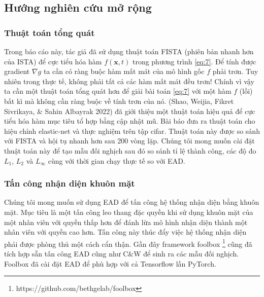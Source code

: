 \subsection{Hướng nghiên cứu mở rộng}
\subsubsection{Thuật toán tổng quát}
Trong báo cáo này, tác giả đã sử dụng thuật toán FISTA (phiên bản nhanh hơn của ISTA) để cực tiểu hóa hàm $f(\mathbf{x}, t)$ trong phương trình \ref{eq:7}. Để tính được gradient $\nabla g$ ta cần có ràng buộc hàm mất mát của mô hình gốc $f$ phải trơn. Tuy nhiên trong thực tế, không phải tất cả các hàm mất mát đều trơn! Chính vì vậy ta cần một thuật toán tổng quát hơn để giải bài toán \ref{eq:7} với một hàm $f$ (lồi) bất kì mà không cần ràng buộc về tính trơn của nó. (Shao, Weijia, Fikret Sivrikaya, \& Sahin Albayrak 2022) đã giới thiệu một thuật toán hiệu quả để cực tiểu hóa hàm mục tiêu tổ hợp bằng cập nhật mũ. Bài báo đưa ra thuật toán cho hiệu chỉnh elastic-net và thực nghiệm trên tập cifar. Thuật toán này được so sánh với FISTA và hội tụ nhanh hơn sau 200 vòng lặp. Chúng tôi mong muốn cài đặt thuật toán này để tạo mẫu đối nghịch sau đó so sánh tỉ lệ thành công, các độ đo $L_1$, $L_2$ và $L_{\infty}$ cùng với thời gian chạy thực tế so với EAD.
\subsubsection{Tấn công nhận diện khuôn mặt}
Chúng tôi mong muốn sử dụng EAD để tấn công hệ thống nhận diện bằng khuôn mặt. Mục tiêu là một tấn công leo thang đặc quyền khi sử dụng khuôn mặt của một nhân viên với quyền thấp hơn để đánh lừa mô hình nhận diện thành một nhân viên với quyền cao hơn. Tấn công này thúc đẩy việc hệ thống nhận diện phải được phòng thủ một cách cẩn thận. Gần đây framework foolbox \footnote{https://github.com/bethgelab/foolbox} cũng đã tích hợp sẵn tấn công EAD cũng như C\&W để sinh ra các mẫu đối nghịch. Foolbox đã cài đặt EAD để phù hợp với cả Tensorflow lần PyTorch.


